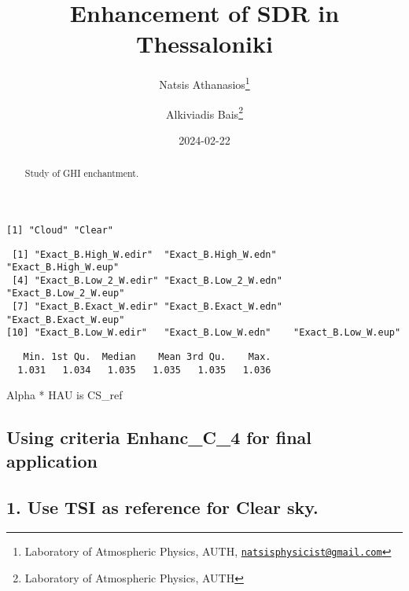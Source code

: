 \documentclass[
  10pt,
  a4paper,oneside]{article}
\title{Enhancement of SDR in Thessaloniki}
\author{Natsis Athanasios\footnote{Laboratory of Atmospheric Physics, AUTH, \href{mailto:natsisphysicist@gmail.com}{\nolinkurl{natsisphysicist@gmail.com}}} \and Alkiviadis Bais\footnote{Laboratory of Atmospheric Physics, AUTH}}
\date{2024-02-22}
\begin{document}
\maketitle
\begin{abstract}
Study of GHI enchantment.
\end{abstract}

{
\hypersetup{linkcolor=}
\setcounter{tocdepth}{4}
\tableofcontents
}
\begin{verbatim}
[1] "Cloud" "Clear"
\end{verbatim}

\begin{verbatim}
 [1] "Exact_B.High_W.edir"  "Exact_B.High_W.edn"   "Exact_B.High_W.eup"  
 [4] "Exact_B.Low_2_W.edir" "Exact_B.Low_2_W.edn"  "Exact_B.Low_2_W.eup" 
 [7] "Exact_B.Exact_W.edir" "Exact_B.Exact_W.edn"  "Exact_B.Exact_W.eup" 
[10] "Exact_B.Low_W.edir"   "Exact_B.Low_W.edn"    "Exact_B.Low_W.eup"   
\end{verbatim}

\begin{verbatim}
   Min. 1st Qu.  Median    Mean 3rd Qu.    Max. 
  1.031   1.034   1.035   1.035   1.035   1.036 
\end{verbatim}

Alpha * HAU is CS\_ref

\hypertarget{using-criteria-enhanc_c_4-for-final-application}{%
\subsection{\texorpdfstring{Using criteria \textbf{Enhanc\_C\_4} for final application}{Using criteria Enhanc\_C\_4 for final application}}\label{using-criteria-enhanc_c_4-for-final-application}}

\hypertarget{use-tsi-as-reference-for-clear-sky.}{%
\subsection{1. Use TSI as reference for Clear sky.}\label{use-tsi-as-reference-for-clear-sky.}}
\end{document}

